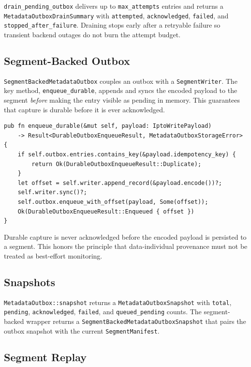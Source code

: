 \texttt{drain\_pending\_outbox} delivers up to \texttt{max\_attempts} entries and
returns a \texttt{MetadataOutboxDrainSummary} with \texttt{attempted},
\texttt{acknowledged}, \texttt{failed}, and \texttt{stopped\_after\_failure}.
Draining stops early after a retryable failure so transient backend outages do
not burn the attempt budget.

\subsection{Segment-Backed Outbox}

\texttt{SegmentBackedMetadataOutbox} couples an outbox with a
\texttt{SegmentWriter}. The key method, \texttt{enqueue\_durable}, appends and
syncs the encoded payload to the segment \emph{before} making the entry visible
as pending in memory. This guarantees that capture is durable before it is ever
acknowledged.

\begin{lstlisting}
pub fn enqueue_durable(&mut self, payload: IptoWritePayload)
    -> Result<DurableOutboxEnqueueResult, MetadataOutboxStorageError>
{
    if self.outbox.entries.contains_key(&payload.idempotency_key) {
        return Ok(DurableOutboxEnqueueResult::Duplicate);
    }
    let offset = self.writer.append_record(&payload.encode())?;
    self.writer.sync()?;
    self.outbox.enqueue_with_offset(payload, Some(offset));
    Ok(DurableOutboxEnqueueResult::Enqueued { offset })
}
\end{lstlisting}

\begin{vnote}
Durable capture is never acknowledged before the encoded payload is persisted to
a segment. This honors the principle that data-individual provenance must not be
treated as best-effort monitoring.
\end{vnote}

\subsection{Snapshots}

\texttt{MetadataOutbox::snapshot} returns a \texttt{MetadataOutboxSnapshot} with
\texttt{total}, \texttt{pending}, \texttt{acknowledged}, \texttt{failed}, and
\texttt{queued\_pending} counts. The segment-backed wrapper returns a
\texttt{SegmentBackedMetadataOutboxSnapshot} that pairs the outbox snapshot with
the current \texttt{SegmentManifest}.

\subsection{Segment Replay}

